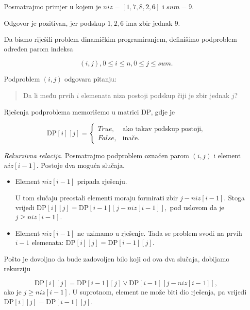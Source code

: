 \begin{solution}
	
	Posmatrajmo primjer u kojem je $
	niz=[1,7,8,2,6]
	$ i  $sum=9.$
	
		Odgovor je pozitivan, jer podskup ${1,2,6}$ ima zbir jednak $9$.
	
	\medskip
	
	Da bismo riješili problem dinamičkim programiranjem, definišimo podproblem određen parom indeksa
	
	$$
	(i,j),
	0 \leq i \leq n,
	0 \leq j \leq sum.
	$$
	
	Podproblem $(i,j)$ odgovara pitanju:
	
	\begin{quote}
		Da li među prvih $i$ elemenata niza postoji podskup čiji je zbir jednak $j$?
	\end{quote}
	
	Rješenja podproblema memorišemo u matrici $\textrm{DP}$, gdje je
	
	$$
	\textrm{DP}[i][j]=
	\begin{cases}
		True, & \text{ako takav podskup postoji},\\
		False, & \text{inače}.
	\end{cases}
	$$
	
	\medskip
	
	\textit{Rekurzivna relacija.} 	Posmatrajmo podproblem označen parom $(i,j)$ i element $niz[i-1]$. Postoje dva moguća slučaja.
	
	\begin{itemize}
		\item {Element $niz[i-1]$ pripada rješenju.}
		
		U tom slučaju preostali elementi moraju formirati zbir $j-niz[i-1].$	Stoga vrijedi $\textrm{DP}[i][j] = \textrm{DP}[i-1][j-niz[i-1]],$
		pod uslovom da je $
		j \geq niz[i-1].$
		
		\item {Element $niz[i-1]$ ne uzimamo u rješenje.} Tada se problem svodi na prvih $i-1$ elemenata:
		$ \textrm{DP}[i][j] = \textrm{DP}[i-1][j].$
		
	\end{itemize}
	
	Pošto je dovoljno da bude zadovoljen bilo koji od ova dva slučaja, dobijamo rekurziju
	
	$$
	\textrm{DP}[i][j]=
	\textrm{DP}[i-1][j] \vee \textrm{DP}[i-1][j-niz[i-1]],$$
	ako je $j \geq niz[i-1].$	U suprotnom, element ne može biti dio rješenja, pa vrijedi $\textrm{DP}[i][j] =	\textrm{DP}[i-1][j].$
	

\end{solution}
